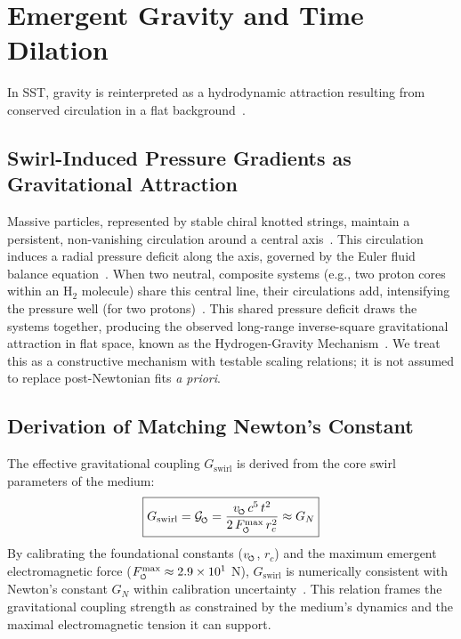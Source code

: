 \documentclass[10pt,reprint,aps,onecolumn,nofootinbib]{revtex4-2}
\newcommand{\bboxeq}[1]{\boxed{\displaystyle #1}}
\newcommand{\Fmaxswirl}{F^{\max}_{\mkern-1mu\scriptscriptstyle\boldsymbol{\circlearrowleft}}}
\begin{document}
\section{Emergent Gravity and Time Dilation}
\label{sec:gravity}
In SST, gravity is reinterpreted as a hydrodynamic attraction resulting from conserved circulation in a flat background~\cite{3}.

\subsection*{Swirl-Induced Pressure Gradients as Gravitational Attraction}
    Massive particles, represented by stable chiral knotted strings, maintain a persistent, non-vanishing circulation around a central axis~\cite{3}. This circulation induces a radial pressure deficit along the axis, governed by the Euler fluid balance equation~\cite{1}. When two neutral, composite systems (e.g., two proton cores within an H$_2$ molecule) share this central line, their circulations add, intensifying the pressure well (for two protons)~\cite{3}. This shared pressure deficit draws the systems together, producing the observed long-range inverse-square gravitational attraction in flat space, known as the Hydrogen-Gravity Mechanism~\cite{3}. We treat this as a constructive mechanism with testable scaling relations; it is not assumed to replace post-Newtonian fits \textit{a priori}.

\subsection*{Derivation of Matching Newton's Constant}
    The effective gravitational coupling $G_\text{swirl}$ is derived from the core swirl parameters of the medium:
    \begin{equation}
    \bboxeq{
        G_{\text{swirl}}
        = \mathcal{G}_{\mkern-2mu\scriptscriptstyle\boldsymbol{\circlearrowleft}}
        = \frac{v_{\mkern-2mu\scriptscriptstyle\boldsymbol{\circlearrowleft}} \, c^5 \, t^2}{2 \, \Fmaxswirl \, r_c^2}
        \approx G_N
    }
    \label{eq:gswirl}
    \end{equation}
    By calibrating the foundational constants ($v_{\mkern-2mu\scriptscriptstyle\boldsymbol{\circlearrowleft}}$, $r_c$) and the maximum emergent electromagnetic force ($\Fmaxswirl \approx 2.9 \times 10^1$ N), $G_\text{swirl}$ is numerically consistent with Newton's constant $G_N$ within calibration uncertainty~\cite{1}. This relation frames the gravitational coupling strength as constrained by the medium’s dynamics and the maximal electromagnetic tension it can support.
\end{document}
